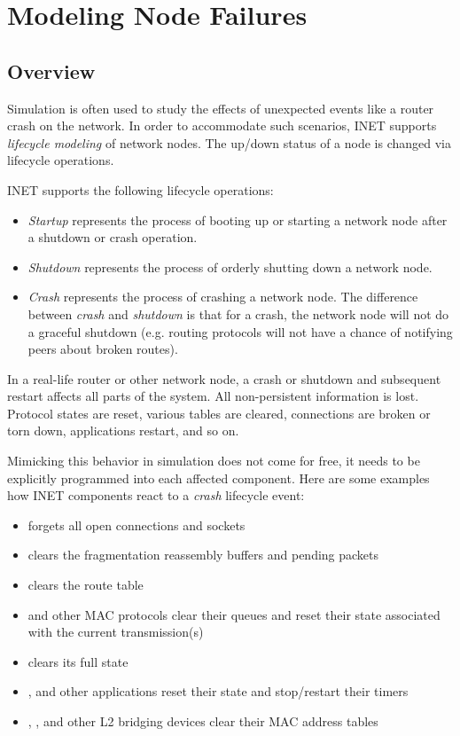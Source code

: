 \chapter{Modeling Node Failures}
\label{cha:lifecycle}

\section{Overview}

Simulation is often used to study the effects of unexpected events like 
a router crash on the network. In order to accommodate such scenarios, INET
supports \textit{lifecycle modeling} of network nodes. The up/down 
status of a node is changed via lifecycle operations.

INET supports the following lifecycle operations:

\begin{itemize}
  \item \textit{Startup} represents the process of booting up or starting
    a network node after a shutdown or crash operation.
  \item \textit{Shutdown} represents the process of orderly shutting down 
    a network node.
  \item \textit{Crash} represents the process of crashing a network node. 
    The difference between \textit{crash} and \textit{shutdown} is that
    for a crash, the network node will not do a graceful shutdown (e.g. 
    routing protocols will not have a chance of notifying peers about 
    broken routes).
\end{itemize}

In a real-life router or other network node, a crash or shutdown and 
subsequent restart affects all parts of the system. All non-persistent
information is lost. Protocol states are reset, various tables are cleared, 
connections are broken or torn down, applications restart, and so on. 

Mimicking this behavior in simulation does not come for free, it 
needs to be explicitly programmed into each affected component.
Here are some examples how INET components react to a \textit{crash}
lifecycle event:

\begin{itemize}
  \item {} forgets all open connections and sockets 
  \item {} clears the fragmentation reassembly buffers and pending packets
  \item {} clears the route table
  \item {} and other MAC protocols clear their queues and reset their state 
    associated with the current transmission(s)  %
  \item {} clears its full state
  \item {},  and other applications 
    reset their state and stop/restart their timers
  \item {}, , and other L2 bridging 
    devices clear their MAC address tables
\end{itemize}

